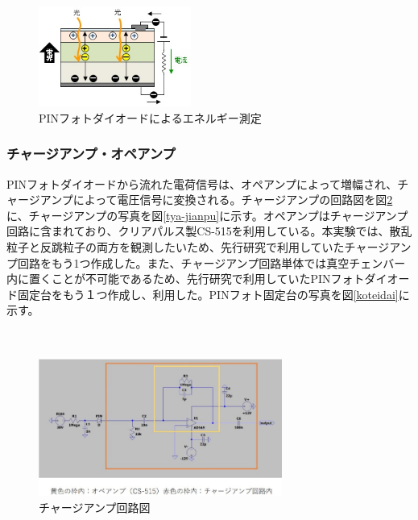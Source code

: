 \documentclass[a4paper,11pt,dvipdfmx]{jsarticle}
\begin{document}
　\begin{figure}[H]
    \centering
    \includegraphics[width=50mm]{picture/setup/pinmoshi2.png}
    \caption{PINフォトダイオードによるエネルギー測定\cite{pin}}
    \label{pin2}
  \end{figure}

\subsubsection{チャージアンプ・オペアンプ}
PINフォトダイオードから流れた電荷信号は、オペアンプによって増幅され、チャージアンプによって電圧信号に変換される。チャージアンプの回路図を図\ref{kairo}に、チャージアンプの写真を図\ref{tya-jianpu}に示す。オペアンプはチャージアンプ回路に含まれており、クリアパルス製CS-515を利用している。本実験では、散乱粒子と反跳粒子の両方を観測したいため、先行研究\cite{2019}で利用していたチャージアンプ回路をもう1つ作成した。また、チャージアンプ回路単体では真空チェンバー内に置くことが不可能であるため、先行研究で利用していたPINフォトダイオード固定台をもう１つ作成し、利用した。PINフォト固定台の写真を図\ref{koteidai}に示す。

　\begin{figure}[H]
    \centering
    \includegraphics[width=80mm]{picture/setup/kairo.png}
    \caption{チャージアンプ回路図}
    \label{kairo}
  \end{figure}
  
\end{document}
